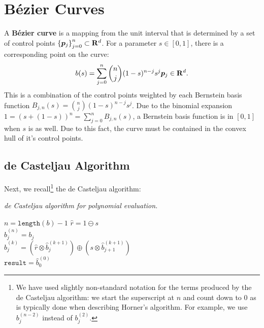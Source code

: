\section{B\'{e}zier Curves}

A \textbf{B\'{e}zier curve} is a mapping from the unit interval
that is determined by a set of control points
\(\left\{\bm{p}_j\right\}_{j = 0}^n \subset \mathbf{R}^d\).
For a parameter \(s \in \left[0, 1\right]\), there is a corresponding
point on the curve:
\begin{equation}
b(s) = \sum_{j = 0}^n \binom{n}{j} (1 - s)^{n - j} s^j \bm{p}_j \in
  \mathbf{R}^d.
\end{equation}
This is a combination of the control points weighted by
each Bernstein basis function
\(B_{j, n}(s) = \binom{n}{j} (1 - s)^{n - j} s^j\).
Due to the binomial expansion
\(1 = (s + (1 - s))^n = \sum_{j = 0}^n B_{j, n}(s)\),
a Bernstein basis function is in
\(\left[0, 1\right]\) when \(s\) is as well. Due to this fact, the
curve must be contained in the convex hull of it's control points.

\subsection{de Casteljau Algorithm}

Next, we recall\footnote{We have used slightly non-standard notation for the
terms produced by the de Casteljau algorithm: we start the superscript at
\(n\) and count down to \(0\) as is typically done when describing Horner's
algorithm. For example, we use \(b_j^{(n - 2)}\) instead of
\(b_j^{(2)}\).} the de Casteljau algorithm:

\begin{breakablealgorithm}
  \caption{\textit{de Casteljau algorithm for polynomial evaluation.}}
  \label{alg:de-casteljau}

  \begin{algorithmic}
      \State \(n = \texttt{length}(b) - 1\)
      \State \(\widehat{r} = 1 \ominus s\)
      \\
        \State \(\widehat{b}_j^{(n)} = b_j\)
      \EndFor
      \\
          \State \(\widehat{b}_j^{(k)} = \left(
              \widehat{r} \otimes \widehat{b}_j^{(k + 1)}\right) \oplus
              \left(s \otimes \widehat{b}_{j + 1}^{(k + 1)}\right)\)
        \EndFor
      \EndFor
      \\
      \State \(\mathtt{result} = \widehat{b}_0^{(0)}\)
    \EndFunction
  \end{algorithmic}
\end{breakablealgorithm}

